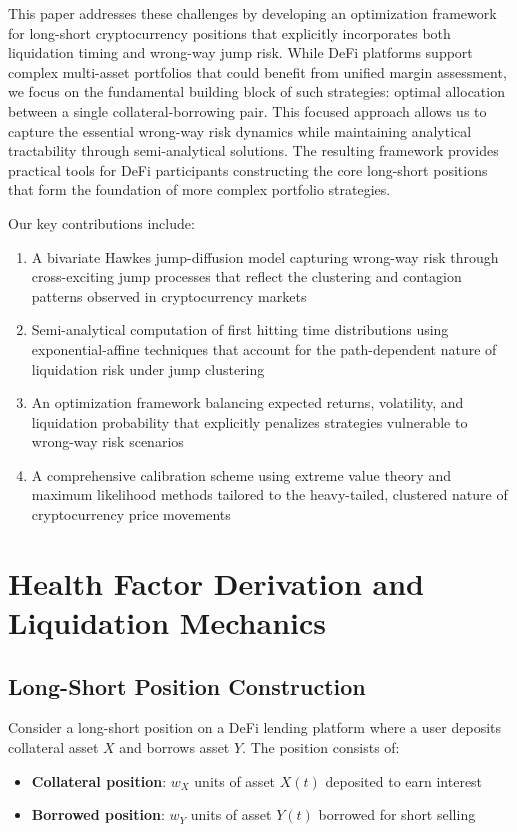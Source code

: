 \documentclass{article}
\theoremstyle{definition}
\begin{document}
This paper addresses these challenges by developing an optimization framework for long-short cryptocurrency positions that explicitly incorporates both liquidation timing and wrong-way jump risk. While DeFi platforms support complex multi-asset portfolios that could benefit from unified margin assessment, we focus on the fundamental building block of such strategies: optimal allocation between a single collateral-borrowing pair. This focused approach allows us to capture the essential wrong-way risk dynamics while maintaining analytical tractability through semi-analytical solutions. The resulting framework provides practical tools for DeFi participants constructing the core long-short positions that form the foundation of more complex portfolio strategies.

Our key contributions include:
\begin{enumerate}
    \item A bivariate Hawkes jump-diffusion model capturing wrong-way risk through cross-exciting jump processes that reflect the clustering and contagion patterns observed in cryptocurrency markets
    \item Semi-analytical computation of first hitting time distributions using exponential-affine techniques that account for the path-dependent nature of liquidation risk under jump clustering
    \item An optimization framework balancing expected returns, volatility, and liquidation probability that explicitly penalizes strategies vulnerable to wrong-way risk scenarios
    \item A comprehensive calibration scheme using extreme value theory and maximum likelihood methods tailored to the heavy-tailed, clustered nature of cryptocurrency price movements
\end{enumerate}

\section{Health Factor Derivation and Liquidation Mechanics}

\subsection{Long-Short Position Construction}

Consider a long-short position on a DeFi lending platform where a user deposits collateral asset $X$ and borrows asset $Y$. The position consists of:
\begin{itemize}
    \item \textbf{Collateral position}: $w_X$ units of asset $X(t)$ deposited to earn interest
    \item \textbf{Borrowed position}: $w_Y$ units of asset $Y(t)$ borrowed for short selling
\end{itemize}
\end{document}
